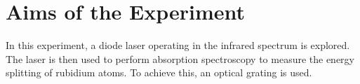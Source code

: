 \section{Aims of the Experiment}

In this experiment, a diode laser operating in the infrared spectrum is explored.
The laser is then used to perform absorption spectroscopy to measure the energy
splitting of rubidium atoms. To achieve this, an optical grating is used.
